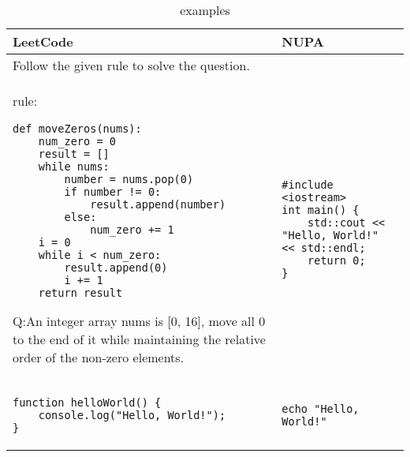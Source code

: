 \documentclass{article}
\begin{document}
\begin{table}[h!]
\centering
\begin{tabular}{|>{\centering\arraybackslash}p{}|>{\centering\arraybackslash}p{}|}
\hline
\textbf{LeetCode} & \textbf{NUPA} \\ \hline
Follow the given rule to solve the question. \\
rule:
\begin{lstlisting}
def moveZeros(nums):
    num_zero = 0
    result = []
    while nums:
        number = nums.pop(0)
        if number != 0:
            result.append(number)
        else:
            num_zero += 1
    i = 0
    while i < num_zero:
        result.append(0)
        i += 1
    return result
\end{lstlisting}
Q:An integer array nums is [0, 16], move all 0 to the end of it while maintaining the relative order of the non-zero elements.

&
\begin{lstlisting}
#include <iostream>
int main() {
    std::cout << "Hello, World!" << std::endl;
    return 0;
}
\end{lstlisting}
\\ \hline
\begin{lstlisting}
function helloWorld() {
    console.log("Hello, World!");
}
\end{lstlisting}
&
\begin{lstlisting}
echo "Hello, World!"
\end{lstlisting}
\\ \hline
\end{tabular}
\caption{examples}
\label{tab:code_table}
\end{table}
\end{document}
